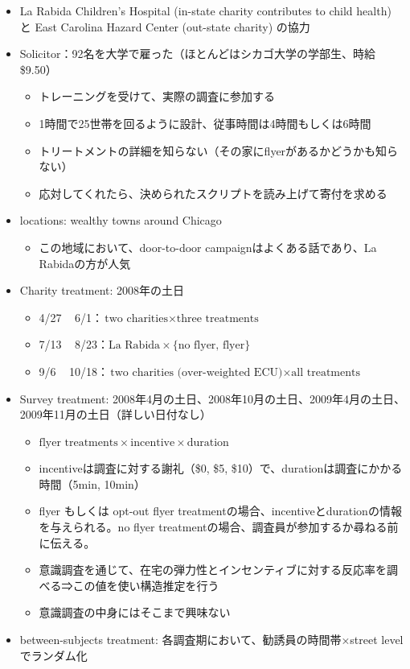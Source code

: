 \documentclass[../root]{subfiles}
\begin{document}
    \begin{itemize}
        \item La Rabida Children's Hospital (in-state charity contributes to child health) と East Carolina Hazard Center (out-state charity) の協力
        \item Solicitor：92名を大学で雇った（ほとんどはシカゴ大学の学部生、時給\$9.50）
        \begin{itemize}
            \item トレーニングを受けて、実際の調査に参加する
            \item 1時間で25世帯を回るように設計、従事時間は4時間もしくは6時間
            \item トリートメントの詳細を知らない（その家にflyerがあるかどうかも知らない）
            \item 応対してくれたら、決められたスクリプトを読み上げて寄付を求める
        \end{itemize}
        \item locations: wealthy towns around Chicago
        \begin{itemize}
            \item この地域において、door-to-door campaignはよくある話であり、La Rabidaの方が人気
        \end{itemize}
        \item Charity treatment: 2008年の土日
        \begin{itemize}
            \item 4/27 ~ 6/1：$\text{two charities}\times\text{three treatments}$
            \item 7/13 ~ 8/23：$\text{La Rabida} \times \{\text{no flyer, flyer}\}$
            \item 9/6 ~ 10/18：$\text{two charities (over-weighted ECU)} \times \text{all treatments}$
        \end{itemize}
        \item Survey treatment: 2008年4月の土日、2008年10月の土日、2009年4月の土日、2009年11月の土日（詳しい日付なし）
        \begin{itemize}
            \item $\text{flyer treatments}\times\text{incentive}\times\text{duration}$
            \item incentiveは調査に対する謝礼（\$0, \$5, \$10）で、durationは調査にかかる時間（5min, 10min）
            \item flyer もしくは opt-out flyer treatmentの場合、incentiveとdurationの情報を与えられる。no flyer treatmentの場合、調査員が参加するか尋ねる前に伝える。
            \item 意識調査を通じて、在宅の弾力性とインセンティブに対する反応率を調べる⇒この値を使い構造推定を行う
            \item 意識調査の中身にはそこまで興味ない
        \end{itemize}
        \item between-subjects treatment: 各調査期において、勧誘員の時間帯×street levelでランダム化
    \end{itemize}
\end{document}
